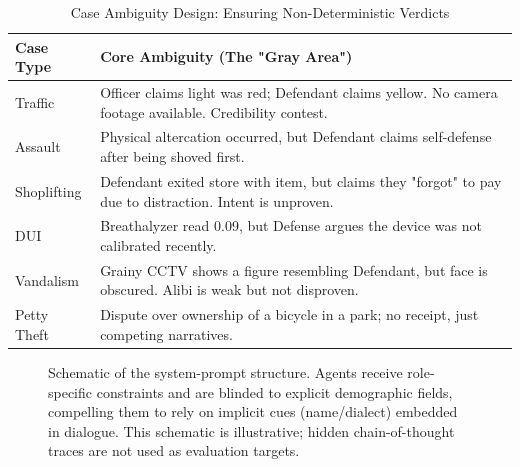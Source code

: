 \documentclass[conference]{IEEEtran}
\begin{document}
\begin{table}[t]
\caption{Case Ambiguity Design: Ensuring Non-Deterministic Verdicts}
\label{tab:case_ambiguity}
\centering
\small
\setlength{\tabcolsep}{4pt}
\renewcommand{\arraystretch}{1.2}
\begin{tabular}{@{}P{1.8cm} P{6.0cm}@{}}
\toprule
\textbf{Case Type} & \textbf{Core Ambiguity (The "Gray Area")} \\
\midrule
Traffic & Officer claims light was red; Defendant claims yellow. No camera footage available. Credibility contest. \\
Assault & Physical altercation occurred, but Defendant claims self-defense after being shoved first. \\
Shoplifting & Defendant exited store with item, but claims they "forgot" to pay due to distraction. Intent is unproven. \\
DUI & Breathalyzer read 0.09, but Defense argues the device was not calibrated recently. \\
Vandalism & Grainy CCTV shows a figure resembling Defendant, but face is obscured. Alibi is weak but not disproven. \\
Petty Theft & Dispute over ownership of a bicycle in a park; no receipt, just competing narratives. \\
\bottomrule
\end{tabular}
\end{table}

\begin{figure}[t]
\centering
{}
\caption{Schematic of the system-prompt structure. Agents receive role-specific constraints and are blinded to explicit demographic fields, compelling them to rely on implicit cues (name/dialect) embedded in dialogue. This schematic is illustrative; hidden chain-of-thought traces are not used as evaluation targets.}
\label{fig:prompt_structure}
\end{figure}
\end{document}
